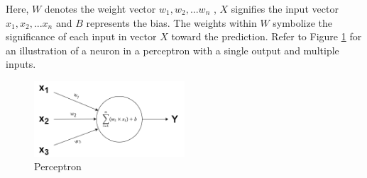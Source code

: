 \documentclass[12pt,twoside,a4paper,parskip]{scrbook} %
\begin{document}
Here, \(W\) denotes the weight vector{ \(w_1, w_2, ... w_n\) }, \(X\) signifies the input vector { \(x_1, x_2, ... x_n\) } and \(B\) represents the bias. The weights within \(W\) symbolize the significance of each input in vector \(X\) toward the prediction. Refer to Figure \ref{fig:Perceptron} for an illustration of a neuron in a perceptron with a single output and multiple inputs.
\begin{figure}[h]
    \centering
    \includegraphics[width=0.5\textwidth]{Images/perceptron.png}
    \caption{Perceptron}
    \label{fig:Perceptron}
  \end{figure}
\end{document}
